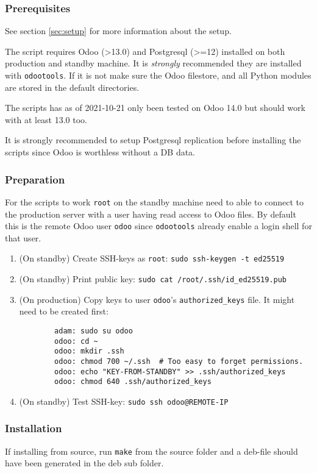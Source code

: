 \documentclass[a4paper]{article}
\begin{document}
\subsubsection{Prerequisites}

See section \ref{sec:setup} for more information about the setup.

The script requires Odoo (>13.0) and Postgresql (>=12) installed on both production and standby machine. It is \emph{strongly} recommended they are installed with \texttt{odootools}. If it is not make sure the Odoo filestore, and all Python modules are stored in the default directories.

The scripts has as of 2021-10-21 only been tested on Odoo 14.0 but should work with at least 13.0 too.

It is strongly recommended to setup Postgresql replication before installing the scripts since Odoo is worthless without a DB data.

\subsubsection{Preparation}

For the scripts to work \texttt{root} on the standby machine need to able to connect to the production server with a user having read access to Odoo files. By default this is the remote Odoo user \texttt{odoo} since \texttt{odootools} already enable a login shell for that user.

\begin{enumerate}
	\item (On standby) Create SSH-keys as \texttt{root}: \texttt{sudo ssh-keygen -t ed25519}
	\item (On standby) Print public key: \texttt{sudo cat /root/.ssh/id\_ed25519.pub}
	\item (On production) Copy keys to user \texttt{odoo}'s \texttt{authorized\_keys} file. It might need to be created first:
	\begin{verbatim}
		adam: sudo su odoo
		odoo: cd ~
		odoo: mkdir .ssh
		odoo: chmod 700 ~/.ssh  # Too easy to forget permissions.
		odoo: echo "KEY-FROM-STANDBY" >> .ssh/authorized_keys
		odoo: chmod 640 .ssh/authorized_keys
	\end{verbatim}
	\item (On standby) Test SSH-key: \texttt{sudo ssh odoo@REMOTE-IP}
\end{enumerate}

\subsubsection{Installation}
	If installing from source, run \texttt{make} from the source folder and a deb-file should have been generated in the deb sub folder.
	
\end{document}
